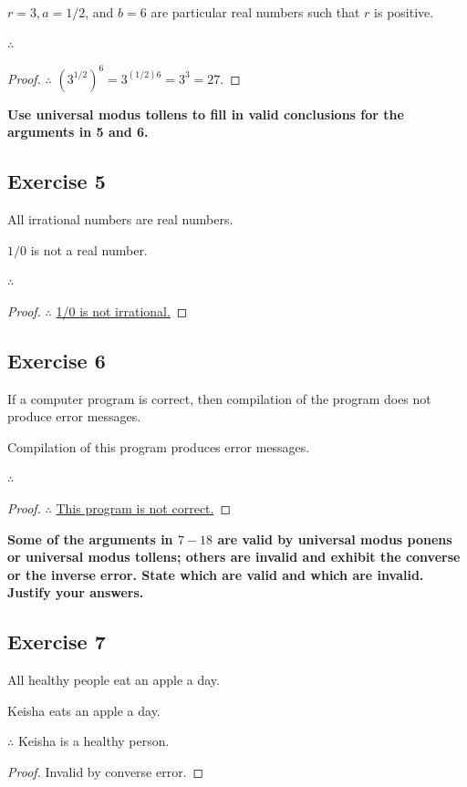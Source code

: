 \documentclass[14pt]{extarticle}
\newcommand{\fbl}{\underline{\hspace{1cm}}\,\,}
\begin{document}
$r = 3, a = 1/2$, and $b = 6$ are particular real numbers such that $r$ is positive.

$\therefore$ \fbl

\begin{proof}
    $\therefore$ \underline{$(3^{1/2})^{6} = 3^{(1/2)6} = 3^3 = 27$}.
\end{proof}

{\bf \color{cyan} Use universal modus tollens to fill in valid conclusions for the arguments in 5 and 6.}

\subsection{Exercise 5}
All irrational numbers are real numbers.

$1/0$ is not a real number.

$\therefore$ \fbl

\begin{proof}
    $\therefore$ \underline{1/0 is not irrational.}
\end{proof}

\subsection{Exercise 6}
If a computer program is correct, then compilation of the program does not produce error messages.

Compilation of this program produces error messages.

$\therefore$ \fbl

\begin{proof}
    $\therefore$ \underline{This program is not correct.}
\end{proof}

{\bf \color{cyan} Some of the arguments in $7-18$ are valid by universal modus ponens or universal modus tollens; others are invalid and exhibit the converse or the inverse error. State which are valid and which are invalid. Justify your answers.}

\subsection{Exercise 7}
All healthy people eat an apple a day.

Keisha eats an apple a day.

$\therefore$ Keisha is a healthy person.

\begin{proof}
    Invalid by converse error.
\end{proof}
\end{document}
